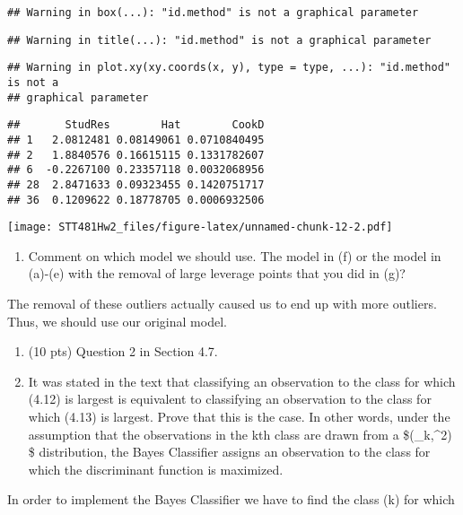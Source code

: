 \documentclass[]{article}
\providecommand{\tightlist}{%
  \setlength{\itemsep}{0pt}\setlength{\parskip}{0pt}}
\begin{document}
\begin{verbatim}
## Warning in box(...): "id.method" is not a graphical parameter
\end{verbatim}

\begin{verbatim}
## Warning in title(...): "id.method" is not a graphical parameter
\end{verbatim}

\begin{verbatim}
## Warning in plot.xy(xy.coords(x, y), type = type, ...): "id.method" is not a
## graphical parameter
\end{verbatim}

\begin{verbatim}
##       StudRes        Hat        CookD
## 1   2.0812481 0.08149061 0.0710840495
## 2   1.8840576 0.16615115 0.1331782607
## 6  -0.2267100 0.23357118 0.0032068956
## 28  2.8471633 0.09323455 0.1420751717
## 36  0.1209622 0.18778705 0.0006932506
\end{verbatim}

\texttt{[image: STT481Hw2\_files/figure-latex/unnamed-chunk-12-2.pdf]}

\begin{enumerate}
\def\labelenumi{(\alph{enumi})}
\setcounter{enumi}{7}
\tightlist
\item
  Comment on which model we should use. The model in (f) or the model in
  (a)-(e) with the removal of large leverage points that you did in (g)?
\end{enumerate}

The removal of these outliers actually caused us to end up with more
outliers. Thus, we should use our original model.

\begin{enumerate}
\def\labelenumi{\arabic{enumi}.}
\setcounter{enumi}{2}
\item
  (10 pts) Question 2 in Section 4.7.
\item
  It was stated in the text that classifying an observation to the class
  for which (4.12) is largest is equivalent to classifying an
  observation to the class for which (4.13) is largest. Prove that this
  is the case. In other words, under the assumption that the
  observations in the kth class are drawn from a
  \$(\mu\_k,\sigma\^{}2) \$ distribution, the Bayes Classifier
  assigns an observation to the class for which the discriminant
  function is maximized.
\end{enumerate}

In order to implement the Bayes Classifier we have to find the class (k)
for which
\end{document}
